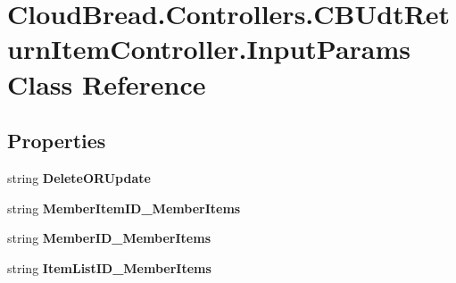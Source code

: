 \hypertarget{class_cloud_bread_1_1_controllers_1_1_c_b_udt_return_item_controller_1_1_input_params}{}\section{Cloud\+Bread.\+Controllers.\+C\+B\+Udt\+Return\+Item\+Controller.\+Input\+Params Class Reference}
\label{class_cloud_bread_1_1_controllers_1_1_c_b_udt_return_item_controller_1_1_input_params}
\subsection*{Properties}
\begin{DoxyCompactItemize}
\item 
string {\bfseries Delete\+O\+R\+Update}\hypertarget{class_cloud_bread_1_1_controllers_1_1_c_b_udt_return_item_controller_1_1_input_params_a419e4b4c559dff1880ca907f4ce342fb}{}\label{class_cloud_bread_1_1_controllers_1_1_c_b_udt_return_item_controller_1_1_input_params_a419e4b4c559dff1880ca907f4ce342fb}

\item 
string {\bfseries Member\+Item\+I\+D\+\_\+\+Member\+Items}\hypertarget{class_cloud_bread_1_1_controllers_1_1_c_b_udt_return_item_controller_1_1_input_params_a52224baf1c38cb61f7bf63422e9d5959}{}\label{class_cloud_bread_1_1_controllers_1_1_c_b_udt_return_item_controller_1_1_input_params_a52224baf1c38cb61f7bf63422e9d5959}

\item 
string {\bfseries Member\+I\+D\+\_\+\+Member\+Items}\hypertarget{class_cloud_bread_1_1_controllers_1_1_c_b_udt_return_item_controller_1_1_input_params_a131338ec853de747eb24634af5656257}{}\label{class_cloud_bread_1_1_controllers_1_1_c_b_udt_return_item_controller_1_1_input_params_a131338ec853de747eb24634af5656257}

\item 
string {\bfseries Item\+List\+I\+D\+\_\+\+Member\+Items}\hypertarget{class_cloud_bread_1_1_controllers_1_1_c_b_udt_return_item_controller_1_1_input_params_a7af4e6ea991c25048148729a7d1574c6}{}\label{class_cloud_bread_1_1_controllers_1_1_c_b_udt_return_item_controller_1_1_input_params_a7af4e6ea991c25048148729a7d1574c6}


\end{DoxyCompactItemize}
